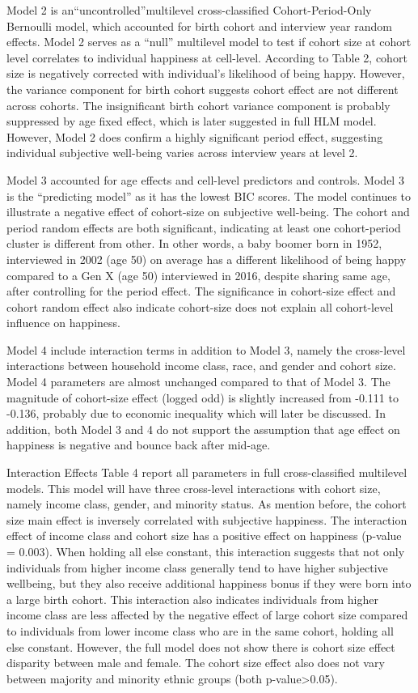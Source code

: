 Model 2 is an“uncontrolled”multilevel cross-classified Cohort-Period-Only Bernoulli model, which accounted for birth cohort and interview year random effects. Model 2 serves as a “null” multilevel model to test if cohort size at cohort level correlates to individual happiness at cell-level. According to Table 2, cohort size is negatively corrected with individual’s likelihood of being happy. However, the variance component for birth cohort suggests cohort effect are not different across cohorts. The insignificant birth cohort variance component is probably suppressed by age fixed effect, which is later suggested in full HLM model. However, Model 2 does confirm a highly significant period effect, suggesting individual subjective well-being varies across interview years at level 2.

Model 3 accounted for age effects and cell-level predictors and controls. Model 3 is the “predicting model” as it has the lowest BIC scores. The model continues to illustrate a negative effect of cohort-size on subjective well-being. The cohort and period random effects are both significant, indicating at least one cohort-period cluster is different from other. In other words, a baby boomer born in 1952, interviewed in 2002 (age 50) on average has a different likelihood of being happy compared to a Gen X (age 50) interviewed in 2016, despite sharing same age, after controlling for the period effect. The significance in cohort-size effect and cohort random effect also indicate cohort-size does not explain all cohort-level influence on happiness.

Model 4 include interaction terms in addition to Model 3, namely the cross-level interactions between household income class, race, and gender and cohort size. Model 4 parameters are almost unchanged compared to that of Model 3. The magnitude of cohort-size effect (logged odd) is slightly increased from -0.111 to -0.136, probably due to economic inequality which will later be discussed. In addition, both Model 3 and 4 do not support the assumption that age effect on happiness is negative and bounce back after mid-age.

Interaction Effects
Table 4 report all parameters in full cross-classified multilevel models. This model will have three cross-level interactions with cohort size, namely income class, gender, and minority status. As mention before, the cohort size main effect is inversely correlated with subjective happiness. The interaction effect of income class and cohort size has a positive effect on happiness (p-value = 0.003). When holding all else constant, this interaction suggests that not only individuals from higher income class generally tend to have higher subjective wellbeing, but they also receive additional happiness bonus if they were born into a large birth cohort. This interaction also indicates individuals from higher income class are less affected by the negative effect of large cohort size compared to individuals from lower income class who are in the same cohort, holding all else constant. However, the full model does not show there is cohort size effect disparity between male and female. The cohort size effect also does not vary between majority and minority ethnic groups (both p-value>0.05).

